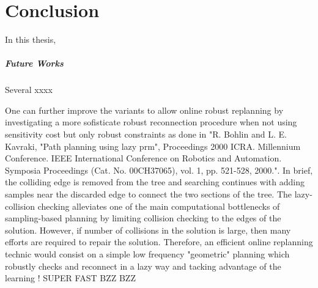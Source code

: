 \chapter{Conclusion}

\glsresetall

In this thesis, 

\paragraph{Future Works} Several xxxx 

One can further improve the  variants to allow online robust replanning by investigating a more sofisticate robust reconnection procedure when not using sensitivity cost but only robust constraints as done in "R. Bohlin and L. E. Kavraki, "Path planning using lazy prm", Proceedings 2000 ICRA. Millennium Conference. IEEE International Conference on Robotics and Automation. Symposia Proceedings (Cat. No. 00CH37065), vol. 1, pp. 521-528, 2000.".
In brief, the colliding edge is removed from the tree and searching continues with adding samples near the discarded edge to connect the two sections of the tree. The lazy-collision checking alleviates one of the main computational bottlenecks of sampling-based planning by limiting collision checking to the edges of the solution. 
However, if number of collisions in the solution is large, then many efforts are required to repair the solution. 
Therefore, an efficient online replanning technic would consist on a simple low frequency "geometric" planning which robustly checks and reconnect in a lazy way and tacking advantage of the learning ! SUPER FAST BZZ BZZ 